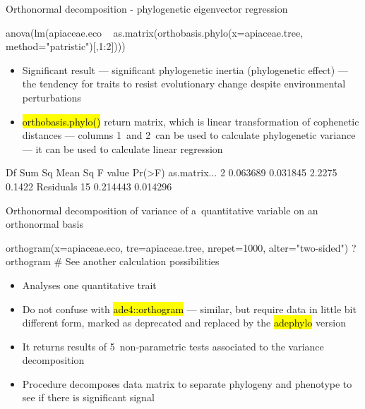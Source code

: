 \documentclass[compress, ucs, xelatex, 11pt, xcolor=svgnames,
  hyperref={
    bookmarks=true,
    unicode=true,
    colorlinks=true,
    pdftitle={Molecular data in R},
    plainpages=false,
    pdfauthor={Vojtech Zeisek},
    pdfsubject={Course about phylogeny and evolution in R},
    pdfcreator={XeLaTeX},
    pdfkeywords={R, evolution, phylogeny, molecular data},
    linkcolor=Tomato,
    anchorcolor=SaddleBrown,
    citecolor=Goldenrod,
    filecolor=DarkMagenta,
    menucolor=Sienna,
    urlcolor=DarkTurquoise,
    pdftex},
  url={hyphens, lowtilde} %
  ]{beamer}
\renewcommand{\texttt}[1]{\hl{\ttfamily #1}}
\begin{document}
\begin{frame}[fragile]{Orthonormal decomposition - phylogenetic eigenvector regression}
  \begin{spluscode}
    anova(lm(apiaceae.eco ~ as.matrix(orthobasis.phylo(x=apiaceae.tree,
      method="patristic")[,1:2])))
  \end{spluscode}
  \begin{itemize}
    \item Significant result --- significant phylogenetic inertia (phylogenetic effect) --- the tendency for traits to resist evolutionary change despite environmental perturbations
    \item \texttt{orthobasis.phylo()} return matrix, which is linear transformation of cophenetic distances --- columns 1~and 2~can be used to calculate phylogenetic variance --- it can be used to calculate linear regression
  \end{itemize}
  \begin{spluscode}
                 Df   Sum Sq  Mean Sq F value Pr(>F)
    as.matrix...  2 0.063689 0.031845  2.2275 0.1422
    Residuals    15 0.214443 0.014296
  \end{spluscode}
\end{frame}

\begin{frame}[fragile]{Orthonormal decomposition of variance of a~quantitative variable on an orthonormal basis}
  \begin{spluscode}
    orthogram(x=apiaceae.eco, tre=apiaceae.tree, nrepet=1000,
      alter="two-sided")
    ?orthogram # See another calculation possibilities
  \end{spluscode}
  \begin{itemize}
    \item Analyses one quantitative trait
    \item Do not confuse with \texttt{ade4::orthogram} --- similar, but require data in little bit different form, marked as deprecated and replaced by the \texttt{adephylo} version
    \item It returns results of 5~non-parametric tests associated to the variance decomposition
    \item Procedure decomposes data matrix to separate phylogeny and phenotype to see if there is significant signal
  \end{itemize}
\end{frame}
\end{document}
